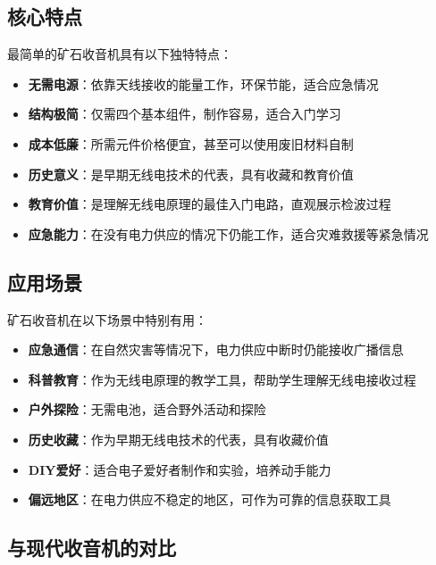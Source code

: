 \documentclass[12pt,UTF8]{ctexbook}
\begin{document}
\subsection{核心特点}

最简单的矿石收音机具有以下独特特点：

\begin{itemize}
  \item \textbf{无需电源}：依靠天线接收的能量工作，环保节能，适合应急情况
  \item \textbf{结构极简}：仅需四个基本组件，制作容易，适合入门学习
  \item \textbf{成本低廉}：所需元件价格便宜，甚至可以使用废旧材料自制
  \item \textbf{历史意义}：是早期无线电技术的代表，具有收藏和教育价值
  \item \textbf{教育价值}：是理解无线电原理的最佳入门电路，直观展示检波过程
  \item \textbf{应急能力}：在没有电力供应的情况下仍能工作，适合灾难救援等紧急情况
\end{itemize}

\subsection{应用场景}

矿石收音机在以下场景中特别有用：

\begin{itemize}
  \item \textbf{应急通信}：在自然灾害等情况下，电力供应中断时仍能接收广播信息
  \item \textbf{科普教育}：作为无线电原理的教学工具，帮助学生理解无线电接收过程
  \item \textbf{户外探险}：无需电池，适合野外活动和探险
  \item \textbf{历史收藏}：作为早期无线电技术的代表，具有收藏价值
  \item \textbf{DIY爱好}：适合电子爱好者制作和实验，培养动手能力
  \item \textbf{偏远地区}：在电力供应不稳定的地区，可作为可靠的信息获取工具
\end{itemize}

\subsection{与现代收音机的对比}
\end{document}
